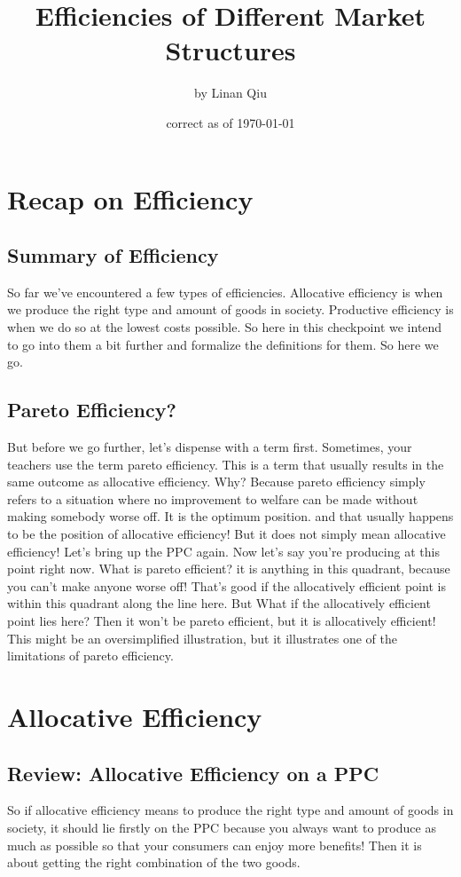 \RequirePackage{../../dominatrix}

\title{Efficiencies of Different Market Structures}
\author{\large by Linan Qiu}
\date{\small correct as of \today}

\maketitle
\tableofcontents
\section{Recap on Efficiency}
\subsection{Summary of Efficiency}
So far we’ve encountered a few types of efficiencies. Allocative efficiency is when we produce the right type and amount of goods in society. Productive efficiency is when we do so at the lowest costs possible. So here in this checkpoint we intend to go into them a bit further and formalize the definitions for them. So here we go.
\subsection{Pareto Efficiency?}
But before we go further, let’s dispense with a term first. Sometimes, your teachers use the term pareto efficiency. This is a term that usually results in the same outcome as allocative efficiency. Why? Because pareto efficiency simply refers to a situation where no improvement to welfare can be made without making somebody worse off. It is the optimum position. and that usually happens to be the position of allocative efficiency! But it does not simply mean allocative efficiency! Let’s bring up the PPC again. Now let’s say you’re producing at this point right now. What is pareto efficient? it is anything in this quadrant, because you can’t make anyone worse off! That’s good if the allocatively efficient point is within this quadrant along the line here. But What if the allocatively efficient point lies here? Then it won’t be pareto efficient, but it is allocatively efficient! This might be an oversimplified illustration, but it illustrates one of the limitations of pareto efficiency.
\newpage
\section{Allocative Efficiency}
\subsection{Review: Allocative Efficiency on a PPC}
So if allocative efficiency means to produce the right type and amount of goods in society, it should lie firstly on the PPC because you always want to produce as much as possible so that your consumers can enjoy more benefits! Then it is about getting the right combination of the two goods. 

